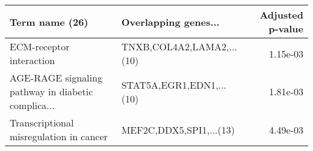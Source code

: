 \begin{tabular}{llr}
\toprule
                                    Term name (26) &      Overlapping genes... &  Adjusted p-value \\
\midrule
                          ECM-receptor interaction & TNXB,COL4A2,LAMA2,...(10) &          1.15e-03 \\
AGE-RAGE signaling pathway in diabetic complica... &  STAT5A,EGR1,EDN1,...(10) &          1.81e-03 \\
           Transcriptional misregulation in cancer &   MEF2C,DDX5,SPI1,...(13) &          4.49e-03 \\
\bottomrule
\end{tabular}
